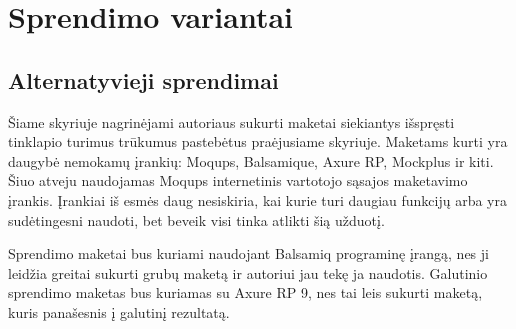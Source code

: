 \documentclass{VUMIFPSkursinis}
\begin{document}


\section{Sprendimo variantai}

\subsection{Alternatyvieji sprendimai}
Šiame skyriuje nagrinėjami autoriaus sukurti maketai siekiantys išspręsti tinklapio turimus trūkumus pastebėtus praėjusiame skyriuje. Maketams kurti yra daugybė nemokamų įrankių: Moqups, Balsamique, Axure RP, Mockplus ir kiti. Šiuo atveju naudojamas Moqups internetinis vartotojo sąsajos maketavimo įrankis. Įrankiai iš esmės daug nesiskiria, kai kurie turi daugiau funkcijų arba yra sudėtingesni naudoti, bet beveik visi tinka atlikti šią užduotį.

Sprendimo maketai bus kuriami naudojant Balsamiq programinę įrangą, nes ji leidžia greitai sukurti grubų maketą ir autoriui jau tekę ja naudotis. Galutinio sprendimo maketas bus kuriamas su Axure RP 9, nes tai leis sukurti maketą, kuris panašesnis į galutinį rezultatą.
\end{document}
